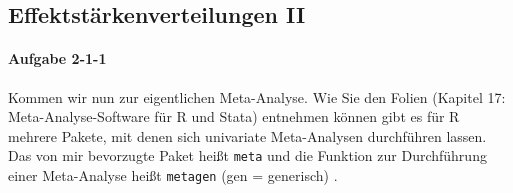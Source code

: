 \documentclass[normalheadings, 10pt]{scrartcl}\usepackage{graphicx, color}
\newcommand{\code}[1]{\texttt{#1}}
\begin{document}
\subsection{Effektstärkenverteilungen II}



\paragraph{Aufgabe 2-1-1} Kommen wir nun zur eigentlichen Meta-Analyse. Wie Sie
den Folien (Kapitel 17: Meta-Analyse-Software für R und Stata) entnehmen können
gibt es für R mehrere Pakete, mit denen sich univariate Meta-Analysen
durchführen lassen. Das von mir bevorzugte Paket heißt \code{meta} und die
Funktion zur Durchführung einer Meta-Analyse heißt \code{metagen} (gen =
generisch) .
\end{document}

